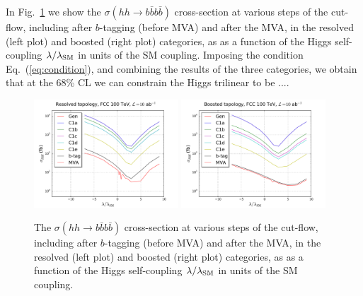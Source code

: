 \documentclass[a4paper,10pt]{article}
\begin{document}
In Fig.~\ref{fig:chi2} we show the $\sigma(hh\to b\bar{b}b\bar{b})$ cross-section at
  various steps of the cut-flow, including after $b$-tagging
  (before MVA) and after the MVA, in the resolved (left plot)
  and boosted (right plot) categories, as  as a function of the Higgs self-coupling
  $\lambda/\lambda_{\rm SM}$ in units of the SM coupling.
  Imposing the condition Eq.~(\ref{eq:condition}), and combining the
  results of the three categories, we obtain
  that at the 68\% CL we can constrain the
  Higgs trilinear to be ....

\begin{figure}[t]
\begin{center}
\includegraphics[width=0.48\textwidth]{plots/res_xSec_100TeV.pdf}
\includegraphics[width=0.48\textwidth]{plots/bst_xSec_100TeV.pdf}
\caption{\small
  The $\sigma(hh\to b\bar{b}b\bar{b})$ cross-section at
  various steps of the cut-flow, including after $b$-tagging
  (before MVA) and after the MVA, in the resolved (left plot)
  and boosted (right plot) categories, as  as a function of the Higgs self-coupling
  $\lambda/\lambda_{\rm SM}$ in units of the SM coupling.
}
\label{fig:chi2}
\end{center}
\end{figure}
\end{document}
